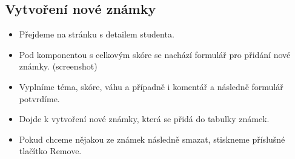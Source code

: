 \subsection{Vytvoření nové známky}
\begin{itemize}
	\item Přejdeme na stránku s detailem studenta.
	\item Pod komponentou s celkovým skóre se nachází formulář pro přidání nové známky. (screenshot)
	\item Vyplníme téma, skóre, váhu a případně i komentář a následně formulář potvrdíme.
	\item Dojde k vytvoření nové známky, která se přidá do tabulky známek.
	\item Pokud chceme nějakou ze známek následně smazat, stiskneme příslušné tlačítko Remove.
\end{itemize}
